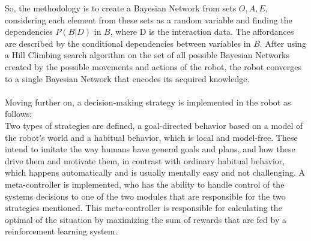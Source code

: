 \documentclass{amsbook}
\begin{document}
{So, the methodology is to create a Bayesian Network from sets $O, A, E$, considering each element from these sets as a random variable and finding the dependencies $P(B|D)$ in $B$, where D is the interaction data. The aﬀordances are described by the conditional dependencies between variables in $B$. After using a Hill Climbing search algorithm on the set of all possible Bayesian Networks created by the possible movements and actions of the robot, the robot converges to a single Bayesian Network that encodes its acquired knowledge.\\
\\
Moving further on, a decision-making strategy is implemented in the robot as follows:\\
Two types of strategies are defined, a goal-directed behavior based on a model of the robot's world and a habitual behavior, which is local and model-free. These intend to imitate the way humans have general goals and plans, and how these drive them and motivate them, in contrast with ordinary habitual behavior, which happens automatically and is usually mentally easy and not challenging. A meta-controller is implemented, who has the ability to handle control of the systems decisions to one of the two modules that are responsible for the two strategies mentioned. This meta-controller is responsible for calculating the optimal  of the situation by maximizing the sum of rewards that are fed by a reinforcement learning system. 

}
\end{document}
